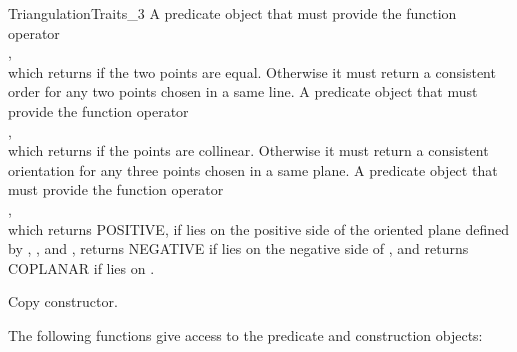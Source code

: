 \begin{ccRefConcept}{TriangulationTraits_3}
{A predicate object that must provide the function operator\\ 
,\\
which returns  if the two points are equal.  Otherwise it must
return a consistent order for any two points chosen in a same line.}
\ccGlue
{}
{A predicate object that must provide the function operator\\
,\\
which returns  if the points are collinear.  Otherwise it must
return a consistent orientation for any three points chosen in a same plane.
}
\ccGlue
{}
{A predicate object that must provide the function operator\\
,\\
which returns POSITIVE, if  lies on the positive side of the oriented
plane  defined by , , and , returns NEGATIVE if
 lies on the negative side of , and returns COPLANAR if 
lies on .}

\ccCreation
{}
\ccThreeToTwo

\ccGlue
{}
{Copy constructor.}

\ccOperations

The following functions give access to the predicate and construction objects:


\ccGlue
{}
\ccGlue
{}

\ccGlue
{}
\ccGlue
{}


\ccHasModels

\\
\\
\\
\\

\end{ccRefConcept}
